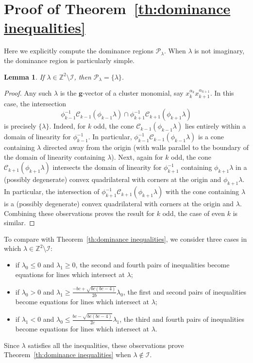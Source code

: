 \documentclass{amsart}
\newtheorem{lemma}[theorem]{Lemma}
\numberwithin{theorem}{section}
\newcommand{\bfg}{\boldsymbol{g}}
\newcommand{\cC}{\mathcal{C}}
\newcommand{\cI}{\mathcal{I}}
\newcommand{\cP}{\mathcal{P}}
\newcommand{\ZZ}{\mathbb{Z}}
\begin{document}
\section{Proof of Theorem~\ref{th:dominance inequalities}}
\label{sec:dominance inequalities}

  Here we explicitly compute the dominance regions $\cP_\lambda$.
  When $\lambda$ is not imaginary, the dominance region is particularly simple.
  \begin{lemma}
    \label{le:cluster monomials}
    If $\lambda\in\ZZ^2\setminus\cI$, then $\cP_\lambda=\{\lambda\}$.
  \end{lemma}
  \begin{proof}
    Any such $\lambda$ is the $\bfg$-vector of a cluster monomial, say $x_k^{\alpha_k}x_{k+1}^{\alpha_{k+1}}$.
    In this case, the intersection
    \[\phi_{k-1}^{-1}\cC_{k-1}(\phi_{k-1}\lambda) \cap \phi_{k+1}^{-1}\cC_{k+1}(\phi_{k+1}\lambda)\]
    is precisely $\{\lambda\}$. 
    Indeed, for $k$ odd, the cone $\cC_{k-1}(\phi_{k-1}\lambda)$ lies entirely within a domain of linearity for $\phi_{k-1}^{-1}$.
    In particular, $\phi_{k-1}^{-1}\cC_{k-1}(\phi_{k-1}\lambda)$ is a cone containing $\lambda$ directed away from the origin (with walls parallel to the boundary of the domain of linearity containing $\lambda$).
    Next, again for $k$ odd, the cone $\cC_{k+1}(\phi_{k+1}\lambda)$ intersects the domain of linearity for $\phi_{k+1}^{-1}$ containing $\phi_{k+1}\lambda$ in a (possibly degenerate) convex quadrilateral with corners at the origin and $\phi_{k+1}\lambda$.
    In particular, the intersection of $\phi_{k+1}^{-1}\cC_{k+1}(\phi_{k+1}\lambda)$ with the cone containing $\lambda$ is a (possibly degenerate) convex quadrilateral with corners at the origin and $\lambda$.
    Combining these observations proves the result for $k$ odd, the case of even $k$ is similar.
  \end{proof}
  To compare with Theorem~\ref{th:dominance inequalities}, we consider three cases in which $\lambda\in\ZZ^2\setminus\cI$:
  \begin{itemize}
    \item if $\lambda_0 \le 0$ and $\lambda_1 \ge 0$, the second and fourth pairs of inequalities become equations for lines which intersect at $\lambda$;
    \item if $\lambda_0 > 0$ and $\lambda_1 \ge \frac{-bc+\sqrt{bc(bc-4)}}{2b}\lambda_0$, the first and second pairs of inequalities become equations for lines which intersect at $\lambda$;
    \item if $\lambda_1 < 0$ and $\lambda_0 \le \frac{bc-\sqrt{bc(bc-4)}}{2c}\lambda_1$, the third and fourth pairs of inequalities become equations for lines which intersect at $\lambda$.
  \end{itemize}
  Since $\lambda$ satisfies all the inequalities, these observations prove Theorem~\ref{th:dominance inequalities} when $\lambda\notin\cI$.
\end{document}
